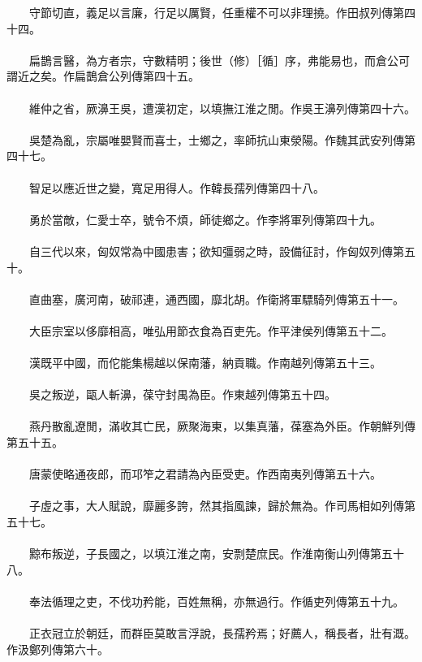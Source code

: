 　　守節切直，義足以言廉，行足以厲賢，任重權不可以非理撓。作田叔列傳第四十四。
\\\\
　　扁鵲言醫，為方者宗，守數精明；後世（修）［循］序，弗能易也，而倉公可謂近之矣。作扁鵲倉公列傳第四十五。
\\\\
　　維仲之省，厥濞王吳，遭漢初定，以填撫江淮之閒。作吳王濞列傳第四十六。
\\\\
　　吳楚為亂，宗屬唯嬰賢而喜士，士鄉之，率師抗山東滎陽。作魏其武安列傳第四十七。
\\\\
　　智足以應近世之變，寬足用得人。作韓長孺列傳第四十八。
\\\\
　　勇於當敵，仁愛士卒，號令不煩，師徒鄉之。作李將軍列傳第四十九。
\\\\
　　自三代以來，匈奴常為中國患害；欲知彊弱之時，設備征討，作匈奴列傳第五十。
\\\\
　　直曲塞，廣河南，破祁連，通西國，靡北胡。作衛將軍驃騎列傳第五十一。
\\\\
　　大臣宗室以侈靡相高，唯弘用節衣食為百吏先。作平津侯列傳第五十二。
\\\\
　　漢既平中國，而佗能集楊越以保南藩，納貢職。作南越列傳第五十三。
\\\\
　　吳之叛逆，甌人斬濞，葆守封禺為臣。作東越列傳第五十四。
\\\\
　　燕丹散亂遼閒，滿收其亡民，厥聚海東，以集真藩，葆塞為外臣。作朝鮮列傳第五十五。
\\\\
　　唐蒙使略通夜郎，而邛笮之君請為內臣受吏。作西南夷列傳第五十六。
\\\\
　　子虛之事，大人賦說，靡麗多誇，然其指風諫，歸於無為。作司馬相如列傳第五十七。
\\\\
　　黥布叛逆，子長國之，以填江淮之南，安剽楚庶民。作淮南衡山列傳第五十八。
\\\\
　　奉法循理之吏，不伐功矜能，百姓無稱，亦無過行。作循吏列傳第五十九。
\\\\
　　正衣冠立於朝廷，而群臣莫敢言浮說，長孺矜焉；好薦人，稱長者，壯有溉。作汲鄭列傳第六十。
